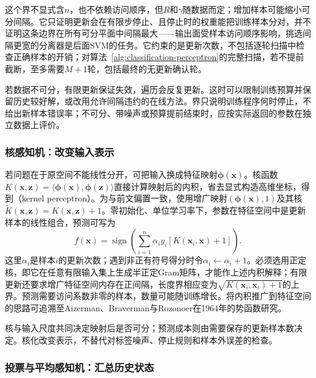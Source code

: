 这个界不显式含$n$，也不依赖访问顺序，但$R$和$\gamma$随数据而定；增加样本可能缩小可分间隔。它只证明更新会在有限步停止、且停止时的权重能把训练样本分对，并不证明这条边界在所有可分平面中间隔最大——输出面受样本访问顺序影响，挑选间隔更宽的分离器是后面SVM的任务。它约束的是更新次数，不包括逐轮扫描中检查正确样本的开销；对算法~\ref{alg:classification-perceptron}的完整扫描，若不提前截断，至多需要$M+1$轮，包括最终的无更新确认轮。

若数据不可分，有限更新保证失效，遍历会反复更新。这时可以限制训练预算并保留历史较好解，或改用允许间隔违约的在线方法。界只说明训练程序何时停止，不给出新样本错误率；不可分、带噪声或预算提前结束时，应按实际返回的参数在独立数据上评价。

\subsubsection{核感知机：改变输入表示}
\label{sec:classification-perceptron-kernel}

若问题在于原空间不能线性分开，可把输入换成特征映射$\bm{\phi}(\bm{x})$。核函数$K(\bm{x},\bm{z})=\langle\bm{\phi}(\bm{x}),\bm{\phi}(\bm{z})\rangle$直接计算映射后的内积，省去显式构造高维坐标，得到（kernel perceptron）。为与前文偏置一致，使用增广映射$(\bm{\phi}(\bm{x}),1)$及其核$\tilde K(\bm{x},\bm{z})=K(\bm{x},\bm{z})+1$。零初始化、单位学习率下，参数在特征空间中是更新样本的线性组合，预测可写为
\begin{equation}
  \label{eq:classification-kernel-perceptron}
  f(\bm{x})=\operatorname{sign}
    \left(\sum_{i=1}^{n}\alpha_i y_i
      [K(\bm{x}_i,\bm{x})+1]\right).
\end{equation}
这里$\alpha_i$是样本$i$的更新次数；遇到非正有符号得分时令$\alpha_i\leftarrow\alpha_i+1$。必须选用正定核，即它在任意有限输入集上生成半正定Gram矩阵，才能作上述内积解释；有限更新还要求增广特征空间内存在正间隔，长度界相应变为$\sqrt{K(\bm{x}_i,\bm{x}_i)+1}$的上界。预测需要访问系数非零的样本，数量可能随训练增长。将内积推广到特征空间的思路可追溯至Aizerman、Braverman与Rozonoer在1964年的势函数研究。

核与输入尺度共同决定映射后是否可分；预测成本则由需要保存的更新样本数决定。核化改变表示，不替代对标签噪声、停止规则和样本外误差的检查。

\subsubsection{投票与平均感知机：汇总历史状态}
\label{sec:classification-perceptron-voted}

